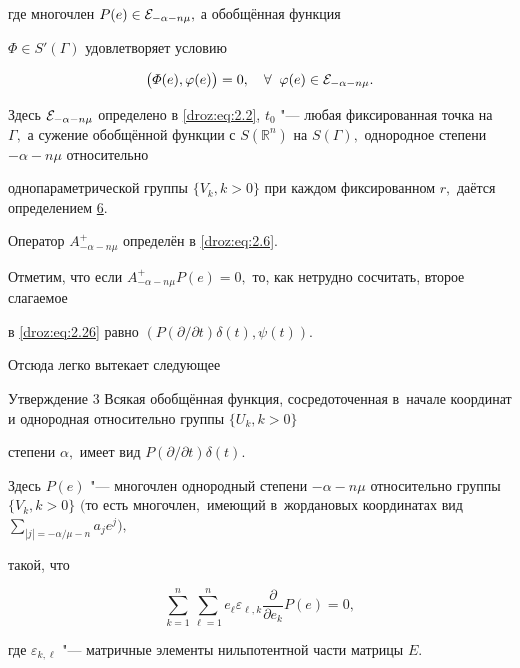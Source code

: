 \begin{theorem}[3]
\begin{itemize}
где многочлен $P(e) \in {\cal E}_{-\alpha-n\mu},$ а обобщённая функция

$\varPhi \in S'(\Gamma)$ удовлетворяет условию

\begin{equation*}

\bigl(\varPhi(e),\varphi(e)\bigr)=0, \quad \forall \;\; \varphi(e)

\in {\cal E}_{-\alpha-n\mu}.


\end{equation*}

\end{itemize}

Здесь ${\cal E}_{-\alpha-n\mu}$ определено в \eqref{droz:eq:2.2}{\rm,} $t_0$ "--- любая фиксированная точка на $\Gamma,$ а сужение обобщённой функции с $S(\mathbb R^n)$ на $S(\Gamma),$ однородное степени \mbox{$- \alpha -n\mu$} относительно

 однопараметрической группы $\{V_k,k>0\}$ при каждом фиксированном $r,$ даётся определением \hyperlink{def:2.2}{\rm 6}.

Оператор $A_{-\alpha-n\mu}^+$ определён в \eqref{droz:eq:2.6}\rm.

\end{theorem}



\smallskip



Отметим, что если $A_{-\alpha-n\mu}^+P(e)=0,$ то, как нетрудно сосчитать, второе слагаемое

в \eqref{droz:eq:2.26} равно $(P({\partial}/{\partial t})\delta(t), \psi(t)).$

Отсюда легко вытекает следующее



\smallskip



\begin{newthm}{Утверждение 3} Всякая обобщённая функция, сосредоточенная в~начале координат и однородная относительно группы $\{U_k, k>0\}$

степени $\alpha, $ имеет вид $P({\partial}/{\partial t})\delta(t).$

Здесь $P(e)$ "--- многочлен однородный степени $-\alpha -n\mu$ относительно группы $\{V_k, k>0\}$ $\Big($то есть многочлен$,$ имеющий в~жордановых координатах вид $\displaystyle\sum\limits_{|j|=-{\alpha}/{\mu}-n}a_je^j\Big),$

такой{\rm,} что

$$\sum_{k=1}^n\sum_{\ell=1}^n e_{\ell}

\varepsilon_{\ell,k} \frac{\partial}{\partial e_k}

P(e)=0,

$$

где $\varepsilon_{k,\ell}$ "--- матричные элементы нильпотентной части матрицы $E.$



\end{newthm}



